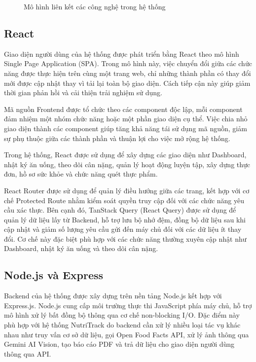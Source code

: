 \documentclass[12pt, a4paper]{report}
\begin{document}
\begin{figure}[htbp]
{
    }
    \caption{Mô hình liên kết các công nghệ trong hệ thống}
    \label{fig:cac_cong_nghe}
\end{figure}

\subsection{React}Giao diện người dùng của hệ thống được phát triển bằng React theo mô hình Single Page Application (SPA). Trong mô hình này, việc chuyển đổi giữa các chức năng được thực hiện trên cùng một trang web, chỉ những thành phần có thay đổi mới được cập nhật thay vì tải lại toàn bộ giao diện. Cách tiếp cận này giúp giảm thời gian phản hồi và cải thiện trải nghiệm sử dụng.

Mã nguồn Frontend được tổ chức theo các component độc lập, mỗi component đảm nhiệm một nhóm chức năng hoặc một phần giao diện cụ thể. Việc chia nhỏ giao diện thành các component giúp tăng khả năng tái sử dụng mã nguồn, giảm sự phụ thuộc giữa các thành phần và thuận lợi cho việc mở rộng hệ thống.

Trong hệ thống, React được sử dụng để xây dựng các giao diện như Dashboard, nhật ký ăn uống, theo dõi cân nặng, quản lý hoạt động luyện tập, xây dựng thực đơn, hồ sơ sức khỏe và chức năng quét thực phẩm.

React Router được sử dụng để quản lý điều hướng giữa các trang, kết hợp với cơ chế Protected Route nhằm kiểm soát quyền truy cập đối với các chức năng yêu cầu xác thực. Bên cạnh đó, TanStack Query (React Query) được sử dụng để quản lý dữ liệu lấy từ Backend, hỗ trợ lưu bộ nhớ đệm, đồng bộ dữ liệu sau khi cập nhật và giảm số lượng yêu cầu gửi đến máy chủ đối với các dữ liệu ít thay đổi. Cơ chế này đặc biệt phù hợp với các chức năng thường xuyên cập nhật như Dashboard, nhật ký ăn uống và theo dõi cân nặng.

\subsection{Node.js và Express}Backend của hệ thống được xây dựng trên nền tảng Node.js kết hợp với Express.js. Node.js cung cấp môi trường thực thi JavaScript phía máy chủ, hỗ trợ mô hình xử lý bất đồng bộ thông qua cơ chế non-blocking I/O. Đặc điểm này phù hợp với hệ thống NutriTrack do backend cần xử lý nhiều loại tác vụ khác nhau như truy vấn cơ sở dữ liệu, gọi Open Food Facts API, xử lý ảnh thông qua Gemini AI Vision, tạo báo cáo PDF và trả dữ liệu cho giao diện người dùng thông qua API.
\end{document}

